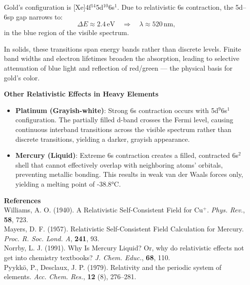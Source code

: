 \begin{technical}
    Gold's configuration is [Xe]4f$^{14}$5d$^{10}$6s$^1$. Due to relativistic 6s contraction, the 5d–6sp gap narrows to:
    \[
    \Delta E \approx 2.4\,\text{eV} \quad \Rightarrow \quad \lambda \approx 520\,\text{nm},
    \]
    in the blue region of the visible spectrum.
    
    In solids, these transitions span energy bands rather than discrete levels. Finite band widths and electron lifetimes broaden the absorption, leading to selective attenuation of blue light and reflection of red/green — the physical basis for gold’s color.
    
    \noindent\textbf{Other Relativistic Effects in Heavy Elements}
    
    \begin{itemize}[leftmargin=*]
    \item \textbf{Platinum (Grayish-white)}: Strong 6s contraction occurs with 5d$^9$6s$^1$ configuration. The partially filled d-band crosses the Fermi level, causing continuous interband transitions across the visible spectrum rather than discrete transitions, yielding a darker, grayish appearance.
    
    \item \textbf{Mercury (Liquid)}: Extreme 6s contraction creates a filled, contracted 6s$^2$ shell that cannot effectively overlap with neighboring atoms' orbitals, preventing metallic bonding. This results in weak van der Waals forces only, yielding a melting point of -38.8°C.
    \end{itemize}
    

\vspace{0.5em}
\noindent\textbf{References}  \\
Williams, A. O. (1940). A Relativistic Self-Consistent Field for Cu\(^+\). \textit{Phys. Rev.}, \textbf{58}, 723.\\
Mayers, D. F. (1957). Relativistic Self-Consistent Field Calculation for Mercury. \textit{Proc. R. Soc. Lond. A}, \textbf{241}, 93.\\
Norrby, L. J. (1991). Why Is Mercury Liquid? Or, why do relativistic effects not get into chemistry textbooks? \textit{J. Chem. Educ.}, \textbf{68}, 110.\\
Pyykkö, P., Desclaux, J. P. (1979). Relativity and the periodic system of elements. \textit{Acc. Chem. Res.}, \textbf{12} (8), 276--281.
\end{technical}
